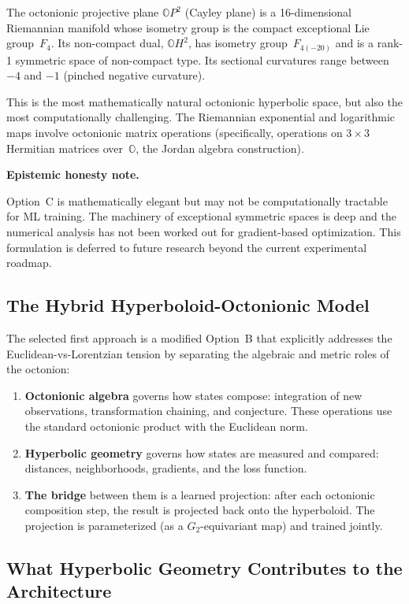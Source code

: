 \documentclass[11pt,a4paper]{article}
\newcommand{\Oct}{\mathbb{O}}
\newenvironment{epistemicnote}{%
  \medskip\noindent\textbf{Epistemic honesty note.}\itshape\space
}{%
  \medskip
}
\begin{document}
The octonionic projective plane $\Oct P^2$ (Cayley plane) is a 16-dimensional Riemannian manifold whose isometry group is the compact exceptional Lie group~$F_4$. Its non-compact dual, $\Oct H^2$, has isometry group~$F_{4(-20)}$ and is a rank-1 symmetric space of non-compact type. Its sectional curvatures range between $-4$ and $-1$ (pinched negative curvature).

This is the most mathematically natural octonionic hyperbolic space, but also the most computationally challenging. The Riemannian exponential and logarithmic maps involve octonionic matrix operations (specifically, operations on $3 \times 3$ Hermitian matrices over~$\Oct$, the Jordan algebra construction).

\begin{epistemicnote}
Option~C is mathematically elegant but may not be computationally tractable for ML training. The machinery of exceptional symmetric spaces is deep and the numerical analysis has not been worked out for gradient-based optimization. This formulation is deferred to future research beyond the current experimental roadmap.
\end{epistemicnote}

\subsection{The Hybrid Hyperboloid-Octonionic Model}

The selected first approach is a modified Option~B that explicitly addresses the Euclidean-vs-Lorentzian tension by separating the algebraic and metric roles of the octonion:
\begin{enumerate}[nosep]
  \item \textbf{Octonionic algebra} governs how states compose: integration of new observations, transformation chaining, and conjecture. These operations use the standard octonionic product with the Euclidean norm.
  \item \textbf{Hyperbolic geometry} governs how states are measured and compared: distances, neighborhoods, gradients, and the loss function.
  \item \textbf{The bridge} between them is a learned projection: after each octonionic composition step, the result is projected back onto the hyperboloid. The projection is parameterized (as a $G_2$-equivariant map) and trained jointly.
\end{enumerate}

\subsection{What Hyperbolic Geometry Contributes to the Architecture}
\end{document}
